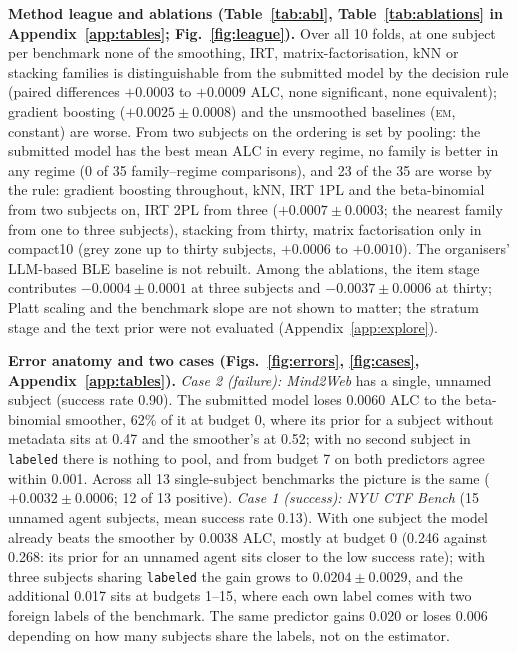 \documentclass{article}
\newcommand{\EM}{\textsc{em}}
\begin{document}
\textbf{Method league and ablations (Table~\ref{tab:abl}, Table~\ref{tab:ablations} in Appendix~\ref{app:tables}; Fig.~\ref{fig:league}).} Over all 10 folds, at one subject
per benchmark none of the smoothing, IRT, matrix-factorisation, kNN or stacking families is distinguishable from the
submitted model by the decision rule (paired differences $+0.0003$ to $+0.0009$ ALC, none significant, none equivalent);
gradient boosting (\mbox{$+0.0025 \pm 0.0008$}) and the unsmoothed baselines (\EM, constant) are worse. From two subjects on
the ordering is set by pooling: the submitted model has the best mean ALC in every regime, no family is better in any
regime (0 of 35 family--regime comparisons), and 23 of the 35 are worse by the rule: gradient boosting throughout,
kNN, IRT 1PL and the beta-binomial from two subjects on, IRT 2PL \citep{lord1980irt, fox2010bayesianirt} from three (\mbox{$+0.0007 \pm 0.0003$}; the nearest family from one to three subjects), stacking \citep{wolpert1992} from thirty, matrix factorisation
\citep{koren2009mf} only in compact10 (grey zone up to thirty subjects, $+0.0006$ to $+0.0010$). The organisers'
LLM-based BLE baseline is not rebuilt. Among the ablations, the item stage contributes \mbox{$-0.0004 \pm 0.0001$} at
three subjects and \mbox{$-0.0037 \pm 0.0006$} at thirty; Platt scaling and the benchmark slope are not shown to matter; the
stratum stage and the text prior were not evaluated (Appendix~\ref{app:explore}).

\textbf{Error anatomy and two cases (Figs.~\ref{fig:errors}, \ref{fig:cases}, Appendix~\ref{app:tables}).}
\emph{Case 2 (failure): Mind2Web} has a single, unnamed subject (success rate 0.90). The submitted model
loses 0.0060 ALC to the beta-binomial smoother, 62\% of it at budget 0, where its prior for a subject without
metadata sits at 0.47 and the smoother's at 0.52; with no second subject in \texttt{labeled} there is nothing to pool,
and from budget 7 on both predictors agree within 0.001. Across all 13 single-subject benchmarks the picture is the same
(\mbox{$+0.0032 \pm 0.0006$}; 12 of 13 positive). \emph{Case 1 (success): NYU CTF Bench} (15 unnamed agent subjects, mean
success rate 0.13). With one subject the model already beats the smoother by 0.0038 ALC, mostly at budget 0 (0.246
against 0.268: its prior for an unnamed agent sits closer to the low success rate); with three subjects sharing
\texttt{labeled} the gain grows to \mbox{$0.0204 \pm 0.0029$}, and the additional 0.017 sits at budgets 1--15, where each own
label comes with two foreign labels of the benchmark. The same
predictor gains 0.020 or loses 0.006 depending on how many subjects share the labels, not on the estimator.
\end{document}
